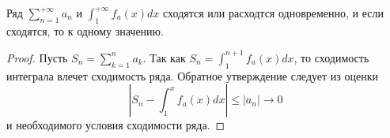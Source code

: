 \begin{lemma}
    \label{lem2.5}
    Ряд $\sum_{n = 1}^{+\infty}a_{n}$ и $\int_{1}^{+\infty}f_{a}(x)dx$ сходятся или расходтся одновременно, и если сходятся, то к одному значению.
\end{lemma}

\begin{proof}
    Пусть $S_{n} = \sum_{k = 1}^{n} a_{k}$. Так как $S_{n} = \int_{1}^{n + 1}f_{a}(x) dx$, то сходимость интеграла влечет сходимость ряда. Обратное утверждение следует из оценки 
    \[\left| S_{n} - \int_{1}^{x} f_{a}(x) dx \right| \leq |a_{n}| \to 0\]
    и необходимого условия сходимости ряда.
\end{proof}